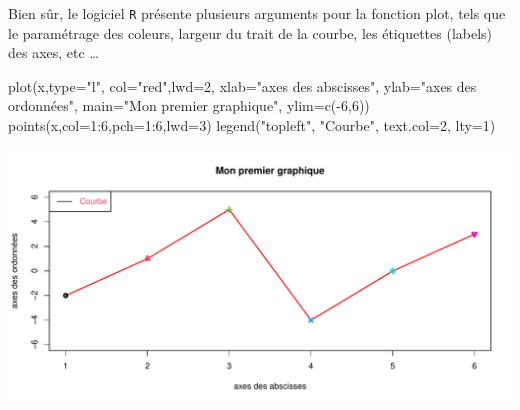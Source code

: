 \documentclass[
  8pt,
  ignorenonframetext,
]{beamer}
\newenvironment{Shaded}{\begin{snugshade}}{\end{snugshade}}
\newcommand{\AttributeTok}[1]{\textcolor[rgb]{0.77,0.63,0.00}{#1}}
\newcommand{\DecValTok}[1]{\textcolor[rgb]{0.00,0.00,0.81}{#1}}
\newcommand{\FunctionTok}[1]{\textcolor[rgb]{0.00,0.00,0.00}{#1}}
\newcommand{\NormalTok}[1]{#1}
\newcommand{\SpecialCharTok}[1]{\textcolor[rgb]{0.00,0.00,0.00}{#1}}
\newcommand{\StringTok}[1]{\textcolor[rgb]{0.31,0.60,0.02}{#1}}
\begin{document}
\begin{frame}[fragile]
Bien sûr, le logiciel \texttt{R} présente plusieurs arguments pour la
fonction plot, tels que le paramétrage des coleurs, largeur du trait de
la courbe, les étiquettes (labels) des axes, etc \ldots 

\begin{Shaded}
\begin{Highlighting}[]
\FunctionTok{plot}\NormalTok{(x,}\AttributeTok{type=}\StringTok{"l"}\NormalTok{, }\AttributeTok{col=}\StringTok{"red"}\NormalTok{,}\AttributeTok{lwd=}\DecValTok{2}\NormalTok{, }\AttributeTok{xlab=}\StringTok{"axes des abscisses"}\NormalTok{, }
\AttributeTok{ylab=}\StringTok{"axes des ordonnées"}\NormalTok{, }\AttributeTok{main=}\StringTok{"Mon premier graphique"}\NormalTok{, }
\AttributeTok{ylim=}\FunctionTok{c}\NormalTok{(}\SpecialCharTok{{-}}\DecValTok{6}\NormalTok{,}\DecValTok{6}\NormalTok{))}
\FunctionTok{points}\NormalTok{(x,}\AttributeTok{col=}\DecValTok{1}\SpecialCharTok{:}\DecValTok{6}\NormalTok{,}\AttributeTok{pch=}\DecValTok{1}\SpecialCharTok{:}\DecValTok{6}\NormalTok{,}\AttributeTok{lwd=}\DecValTok{3}\NormalTok{)}
\FunctionTok{legend}\NormalTok{(}\StringTok{"topleft"}\NormalTok{, }\StringTok{"Courbe"}\NormalTok{, }\AttributeTok{text.col=}\DecValTok{2}\NormalTok{, }\AttributeTok{lty=}\DecValTok{1}\NormalTok{)}
\end{Highlighting}
\end{Shaded}

\begin{center}\includegraphics{Chap2_R_files/figure-beamer/unnamed-chunk-3-1} \end{center}
\end{frame}
\end{document}
